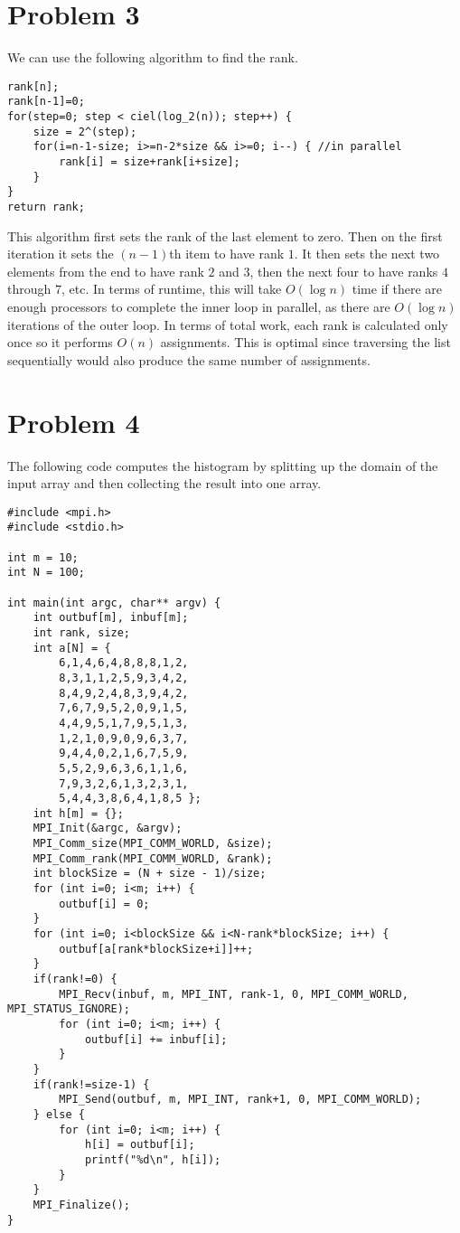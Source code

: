 \documentclass[12pt]{article}
\begin{document}
\section*{Problem 3}

We can use the following algorithm to find the rank.
\begin{verbatim}
rank[n];
rank[n-1]=0;
for(step=0; step < ciel(log_2(n)); step++) {
    size = 2^(step);
    for(i=n-1-size; i>=n-2*size && i>=0; i--) { //in parallel
        rank[i] = size+rank[i+size];
    }
}
return rank;
\end{verbatim}
This algorithm first sets the rank of the last element to zero. Then on the first iteration it sets the \((n-1)\)th item to have rank \(1\). It then
sets the next two elements from the end to have rank \(2\) and \(3\), then the next four to have ranks \(4\) through \(7\), etc. In terms
of runtime, this will take \(O(\log n)\) time if there are enough processors to complete the inner loop in parallel, as there are \(O(\log n)\)
iterations of the outer loop. In terms of total work, each rank is calculated only once so it performs \(O(n)\) assignments. This is optimal
since traversing the list sequentially would also produce the same number of assignments.

\section*{Problem 4}

The following code computes the histogram by splitting up the domain of the input array and then collecting the result into one array.
\scriptsize
\begin{verbatim}
#include <mpi.h>
#include <stdio.h>

int m = 10;
int N = 100;

int main(int argc, char** argv) {
    int outbuf[m], inbuf[m];
    int rank, size;
    int a[N] = {
        6,1,4,6,4,8,8,8,1,2,
        8,3,1,1,2,5,9,3,4,2,
        8,4,9,2,4,8,3,9,4,2,
        7,6,7,9,5,2,0,9,1,5,
        4,4,9,5,1,7,9,5,1,3,
        1,2,1,0,9,0,9,6,3,7,
        9,4,4,0,2,1,6,7,5,9,
        5,5,2,9,6,3,6,1,1,6,
        7,9,3,2,6,1,3,2,3,1,
        5,4,4,3,8,6,4,1,8,5 };
    int h[m] = {};
    MPI_Init(&argc, &argv);
    MPI_Comm_size(MPI_COMM_WORLD, &size);
    MPI_Comm_rank(MPI_COMM_WORLD, &rank);
    int blockSize = (N + size - 1)/size;
    for (int i=0; i<m; i++) {
        outbuf[i] = 0;
    }
    for (int i=0; i<blockSize && i<N-rank*blockSize; i++) {
        outbuf[a[rank*blockSize+i]]++;
    }
    if(rank!=0) {
        MPI_Recv(inbuf, m, MPI_INT, rank-1, 0, MPI_COMM_WORLD, MPI_STATUS_IGNORE);
        for (int i=0; i<m; i++) {
            outbuf[i] += inbuf[i];
        }
    }
    if(rank!=size-1) {
        MPI_Send(outbuf, m, MPI_INT, rank+1, 0, MPI_COMM_WORLD);
    } else {
        for (int i=0; i<m; i++) {
            h[i] = outbuf[i];
            printf("%d\n", h[i]);
        }
    }
    MPI_Finalize();
}
\end{verbatim}
\normalsize
\end{document}
